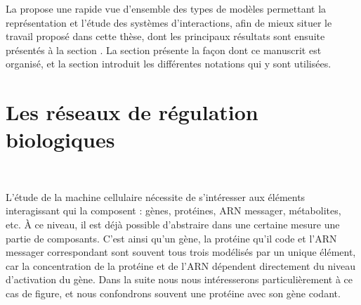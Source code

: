

La  propose une rapide vue d'ensemble des types de modèles permettant
la représentation et l'étude des systèmes d'interactions,
afin de mieux situer le travail proposé dans cette thèse,
dont les principaux résultats sont ensuite présentés à la section .
La section  présente la façon dont ce manuscrit est organisé,
et la section  introduit les différentes notations qui y sont utilisées.



\section{Les réseaux de régulation biologiques}


\\

L'étude de la machine cellulaire nécessite de s'intéresser aux éléments interagissant
qui la composent :
gènes, protéines, ARN messager, métabolites, etc.
% 
À ce niveau, il est déjà possible d'abstraire dans une certaine mesure
une partie de composants.
C'est ainsi qu'un gène, la protéine qu'il code et l'ARN messager correspondant sont
souvent tous trois modélisés par un unique élément,
car la concentration de la protéine et de l'ARN
dépendent directement du niveau d'activation du gène.
Dans la suite nous nous intéresserons particulièrement à ce cas de figure,
et nous confondrons souvent une protéine avec son gène codant.

